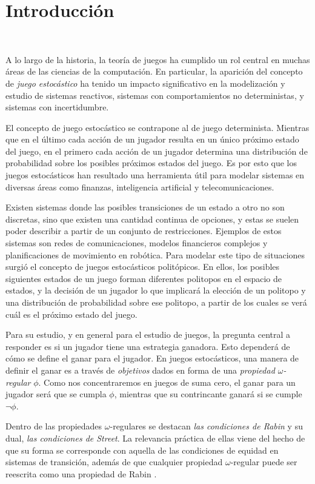 \chapter{Introducción}
~\label{cap:intro}
\vspace{-1cm}

A lo largo de la historia, la teoría de juegos ha cumplido un rol central en
muchas áreas de las ciencias de la computación. En particular, la aparición del
concepto de \textit{juego estocástico} ha tenido un impacto significativo en la
modelización y estudio de sistemas reactivos, sistemas con comportamientos no
deterministas, y sistemas con incertidumbre.

El concepto de juego estocástico se contrapone al de juego determinista.
Mientras que en el último cada acción de un jugador resulta en un único próximo
estado del juego, en el primero cada acción de un jugador determina una
distribución de probabilidad sobre los posibles próximos estados del juego. Es
por esto que los juegos estocásticos han resultado una herramienta útil para
modelar sistemas en diversas áreas como finanzas, inteligencia artificial y
telecomunicaciones.

Existen sistemas donde las posibles transiciones de un estado a otro no son
discretas, sino que existen una cantidad continua de opciones, y estas se
suelen poder describir a partir de un conjunto de restricciones. Ejemplos de
estos sistemas son redes de comunicaciones, modelos financieros complejos y
planificaciones de movimiento en robótica. Para modelar este tipo de
situaciones surgió el concepto de juegos estocásticos politópicos. En ellos,
los posibles siguientes estados de un juego forman diferentes politopos en el
espacio de estados, y la decisión de un jugador lo que implicará la elección de
un politopo y una distribución de probabilidad sobre ese politopo, a partir de
los cuales se verá cuál es el próximo estado del juego.

Para su estudio, y en general para el estudio de juegos, la pregunta central a
responder es si un jugador tiene una estrategia ganadora. Esto dependerá de
cómo se define el ganar para el jugador. En juegos estocásticos, una manera de
definir el ganar es a través de \textit{objetivos} dados en forma de una
\textit{propiedad $\omega$-regular} $\phi$. Como nos concentraremos en juegos
de suma cero, el ganar para un jugador será que se cumpla $\phi$, mientras que
su contrincante ganará si se cumple $\neg \phi$.

Dentro de las propiedades $\omega$-regulares se destacan \textit{las
	condiciones de Rabin} y su dual, \textit{las condiciones de Street}. La
relevancia práctica de ellas viene del hecho de que su forma se corresponde con
aquella de las condiciones de equidad en sistemas de transición, además de que
cualquier propiedad $\omega$-regular puede ser reescrita como una propiedad de
Rabin \cite{AutomataLogicsInfiniteGames}.

